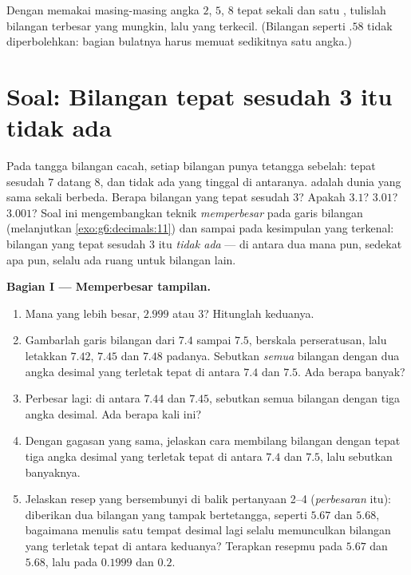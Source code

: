 \begin{exercise}[$\star\star\star$]\label{exo:g6:decimals:12}
Dengan memakai masing-masing angka $2$, $5$, $8$ tepat sekali dan
satu , tulislah bilangan terbesar yang mungkin, lalu
yang terkecil. (Bilangan seperti $.58$ tidak diperbolehkan: bagian
bulatnya harus memuat sedikitnya satu angka.)
\end{exercise}

\section{Soal: Bilangan tepat sesudah 3 itu tidak ada}

\begin{problem}
\label{pb:g6:decimals:1}
Pada tangga bilangan cacah, setiap bilangan punya tetangga
sebelah: tepat sesudah $7$ datang $8$, dan tidak ada yang tinggal
di antaranya.  adalah dunia yang sama sekali
berbeda. Berapa bilangan yang tepat sesudah $3$? Apakah $3.1$?
$3.01$? $3.001$? Soal ini mengembangkan teknik \emph{memperbesar}
pada garis bilangan (melanjutkan \cref{exo:g6:decimals:11}) dan
sampai pada kesimpulan yang terkenal: bilangan yang tepat sesudah
$3$ itu \emph{tidak ada} --- di antara dua  mana
pun, sedekat apa pun, selalu ada ruang untuk bilangan lain.

\medskip
\noindent\textbf{Bagian I --- Memperbesar tampilan.}
\begin{enumerate}
  \item Mana yang lebih besar, $2.999$ atau $3$? Hitunglah 
        keduanya.
  \item Gambarlah garis bilangan dari $7.4$ sampai $7.5$, berskala
        perseratusan, lalu letakkan $7.42$, $7.45$ dan $7.48$
        padanya. Sebutkan \emph{semua} bilangan dengan dua angka
        desimal yang terletak tepat di antara $7.4$ dan $7.5$. Ada
        berapa banyak?
  \item Perbesar lagi: di antara $7.44$ dan $7.45$, sebutkan semua
        bilangan dengan tiga angka desimal. Ada berapa kali ini?
  \item Dengan gagasan yang sama, jelaskan cara membilang bilangan
        dengan tepat tiga angka desimal yang terletak tepat di antara
        $7.4$ dan $7.5$, lalu sebutkan banyaknya.
  \item Jelaskan resep yang bersembunyi di balik pertanyaan 2--4
        (\emph{perbesaran} itu): diberikan dua bilangan yang tampak
        bertetangga, seperti $5.67$ dan $5.68$, bagaimana menulis
        satu tempat desimal lagi selalu memunculkan bilangan yang
        terletak tepat di antara keduanya? Terapkan resepmu pada
        $5.67$ dan $5.68$, lalu pada $0.1999$ dan $0.2$.
\end{enumerate}


\end{problem}

